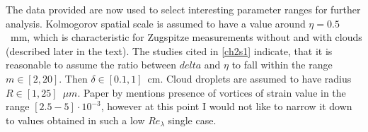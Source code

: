 \documentclass[../main.tex]{subfiles}
\begin{document}
The data provided are now used to select interesting parameter ranges for further analysis. Kolmogorov spatial scale is assumed to have a value around $\eta=0.5$~mm, which is characteristic for Zugspitze measurements without and with clouds (described later in the text). The studies cited in \ref{ch2s1} indicate, that it is reasonable to assume the ratio between $delta$ and $\eta$ to fall within the range $m \in [2,20]$. Then $\delta \in [0.1,1]$~cm. Cloud droplets are assumed to have radius $R \in [1,25]$~$\mu m$. Paper by \citet{Bellin1999} mentions presence of vortices of strain value in the range $[2.5-5] \cdot 10^{-3}$, however at this point I would not like to narrow it down to values obtained in such a low $Re_{\lambda}$ single case.

\end{document}
